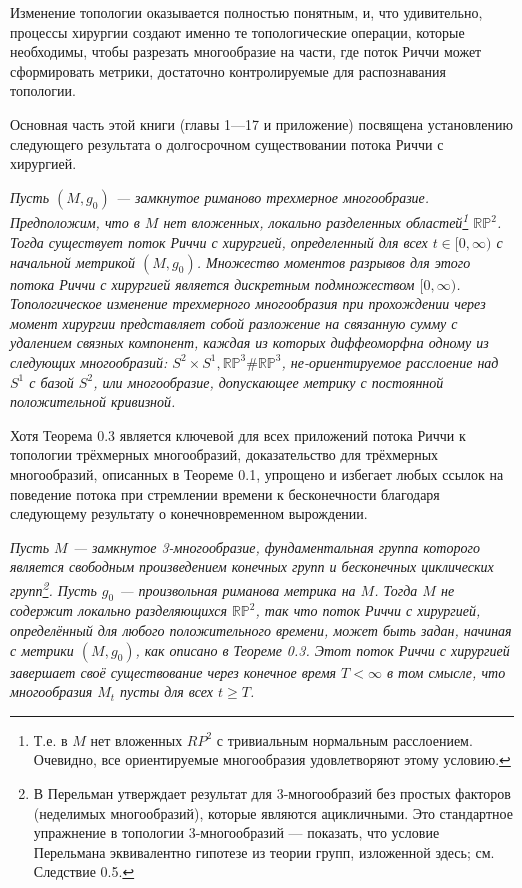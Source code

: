 Изменение топологии оказывается полностью понятным, и, что удивительно, 
процессы хирургии создают именно те топологические операции, которые необходимы, 
чтобы разрезать многообразие на части, где поток Риччи может сформировать 
метрики, достаточно контролируемые для распознавания топологии.

Основная часть этой книги (главы 1—17 и приложение) посвящена установлению 
следующего результата о долгосрочном существовании потока Риччи с хирургией.

\begin{theorem}
\textit{Пусть $(M, g_{0})$ — замкнутое риманово трехмерное 
многообразие. Предположим, что в $M$ нет вложенных, локально разделенных областей\footnote{Т.е. в $M$ нет вложенных $RP^{2}$ с тривиальным нормальным расслоением. Очевидно, все ориентируемые многообразия удовлетворяют этому условию.} 
$\mathbb{RP}^2$. Тогда существует поток Риччи с хирургией, 
определенный для всех $t\in [0,\infty)$ с начальной метрикой $(M, g_{0})$. 
Множество моментов разрывов для этого потока Риччи с хирургией является 
дискретным подмножеством $[0,\infty)$.
Топологическое изменение трехмерного многообразия при прохождении через 
момент хирургии представляет собой разложение на связанную сумму с 
удалением связных компонент, каждая из которых диффеоморфна одному из 
следующих многообразий: $S^{2}\times S^{1}, \mathbb{RP}^3 \# \mathbb{RP}^3$, не-ориентируемое 
расслоение над $S^{1}$ с базой $S^{2}$, или многообразие, допускающее 
метрику с постоянной положительной кривизной.}
\end{theorem}

Хотя Теорема 0.3 является ключевой для всех приложений потока Риччи к 
топологии трёхмерных многообразий, доказательство для трёхмерных многообразий, 
описанных в Теореме 0.1, упрощено и избегает любых ссылок на поведение потока 
при стремлении времени к бесконечности благодаря следующему результату о 
конечновременном вырождении.

\begin{theorem}
\textit{Пусть $M$ — замкнутое 3-многообразие, фундаментальная группа которого 
является свободным произведением конечных групп и бесконечных циклических групп\footnote{В \cite{c54} Перельман утверждает результат для 3-многообразий без простых факторов (неделимых многообразий), которые являются ацикличными. Это стандартное упражнение в топологии 3-многообразий — показать, что условие Перельмана эквивалентно гипотезе из теории групп, изложенной здесь; см. Следствие 0.5.}. 
Пусть $g_{0}$ — произвольная риманова метрика на $M$. Тогда $M$ не содержит локально 
разделяющихся $\mathbb{RP}^2$, так что поток Риччи с хирургией, определённый для любого 
положительного времени, может быть задан, начиная с метрики $(M,g_{0})$, как описано 
в Теореме 0.3. Этот поток Риччи с хирургией завершает своё существование через 
конечное время $T<\infty$ в том смысле, что многообразия $M_{t}$ пусты для всех $t \geq T$.}
\end{theorem}

